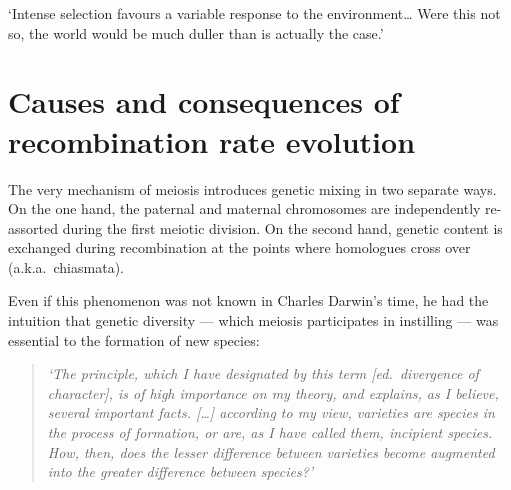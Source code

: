 \begin{savequote}[8cm]
‘Intense selection favours a variable response to the environment… Were this not so, the world would be much duller than is actually the case.’

\end{savequote}

\chapter{\label{ch:3-recombination-variation}Causes and consequences of recombination rate evolution} 

\minitoc{}


The very mechanism of meiosis introduces genetic mixing in two separate ways.
On the one hand, the paternal and maternal chromosomes are independently re-assorted during the first meiotic division.
On the second hand, genetic content is exchanged during recombination at the points where homologues cross over (a.k.a.\ chiasmata).

%
%
Even if this phenomenon was not known in Charles Darwin's time, he had the intuition that genetic diversity — which meiosis participates in instilling — was essential to the formation of new species:

\begin{quote}
	\textit{‘The principle, which I have designated by this term [ed.\ divergence of character], is of high importance on my theory, and explains, as I believe, several important facts. […] according to my view, varieties are species in the process of formation, or are, as I have called them, incipient species. How, then, does the lesser difference between varieties become augmented into the greater difference between species?’}
\end{quote}

